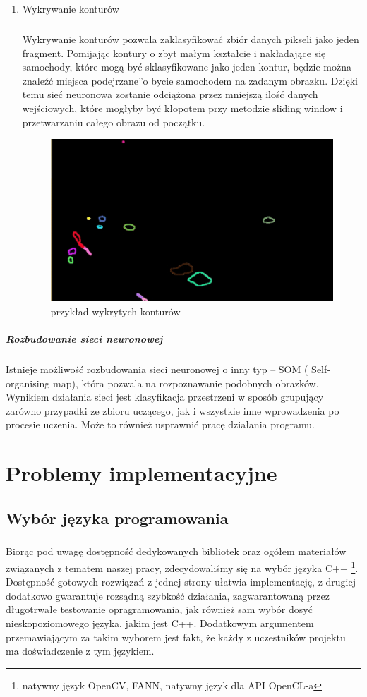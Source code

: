 \documentclass{article}
\begin{document}
\begin{enumerate}
\item Wykrywanie konturów

\subparagraph{} Wykrywanie konturów pozwala zaklasyfikować zbiór danych pikseli jako jeden fragment. Pomijając kontury o zbyt małym kształcie i nakładające się samochody, które mogą być sklasyfikowane jako jeden kontur, będzie można znaleźć miejsca \quotedblbase podejrzane\textquotedblright o bycie samochodem na zadanym obrazku. Dzięki temu sieć neuronowa zostanie odciążona przez mniejszą ilość danych wejściowych, które mogłyby być kłopotem przy metodzie sliding window i przetwarzaniu całego obrazu od początku.

\begin{figure}[H]
\begin{center}
\includegraphics[scale=0.4]{kontury.png} 
\end{center}
\caption{przykład wykrytych konturów}
\label{fig:contours}
\end{figure}

\end{enumerate}

\subparagraph{Rozbudowanie sieci neuronowej} Istnieje możliwość rozbudowania sieci neuronowej o inny typ – SOM ( Self-organising map), która pozwala na rozpoznawanie podobnych obrazków. Wynikiem działania sieci jest klasyfikacja przestrzeni w sposób grupujący zarówno przypadki ze zbioru uczącego, jak i wszystkie inne wprowadzenia po procesie uczenia.  Może to również usprawnić pracę działania programu.

\section{Problemy implementacyjne}
\subsection{Wybór języka programowania}
\subparagraph{} Biorąc pod uwagę dostępność dedykowanych bibliotek oraz ogółem materiałów związanych z tematem naszej pracy, zdecydowaliśmy się na wybór języka C++ \footnote{natywny język OpenCV, FANN, natywny język dla API OpenCL-a}. Dostępność gotowych rozwiązań z jednej strony ułatwia implementację, z drugiej dodatkowo gwarantuje rozsądną szybkość działania, zagwarantowaną przez długotrwałe testowanie opragramowania, jak również sam wybór dosyć nieskopoziomowego języka, jakim jest C++. Dodatkowym argumentem przemawiającym za takim wyborem jest fakt, że każdy z uczestników projektu ma doświadczenie z tym językiem.
\end{document}
